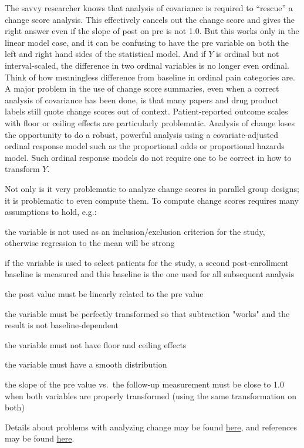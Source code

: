 The savvy researcher knows that analysis of covariance is required to ``rescue'' a change score analysis. This effectively cancels out the change score and gives the right answer even if the slope of post on pre is not 1.0. But this works only in the linear model case, and it can be confusing to have the pre variable on both the left and right hand sides of the statistical model. And if $Y$ is ordinal but not interval-scaled, the difference in two ordinal variables is no longer even ordinal.  Think of how meaningless difference from baseline in ordinal pain categories are. A major problem in the use of change score summaries, even when a correct analysis of covariance has been done, is that many papers and drug product labels still quote change scores out of context.  Patient-reported outcome scales with floor or ceiling effects are particularly problematic.  Analysis of change loses the opportunity to do a robust, powerful analysis using a covariate-adjusted ordinal response model such as the proportional odds or proportional hazards model.  Such ordinal response models do not require one to be correct in how to transform $Y$.


Not only is it very problematic to analyze change scores in parallel group designs; it is problematic to even compute them.  To compute change scores requires many assumptions to hold, e.g.:
\be
\item the variable is not used as an inclusion/exclusion criterion for the study, otherwise regression to the mean will be strong
\item if the variable is used to select patients for the study, a second post-enrollment baseline is measured and this baseline is the one used for all subsequent analysis
\item the post value must be linearly related to the pre value
\item the variable must be perfectly transformed so that subtraction "works" and the result is not baseline-dependent
\item the variable must not have floor and ceiling effects
\item the variable must have a smooth distribution
\item the slope of the pre value vs.\ the follow-up measurement must be close to 1.0 when both variables are properly transformed (using the same transformation on both)
\ee

Details about problems with analyzing change may be found \href{http://biostat.mc.vanderbilt.edu/MeasureChange}{here}, and references may be found \href{http://www.citeulike.org/user/harrelfe/tag/change}{here}.

